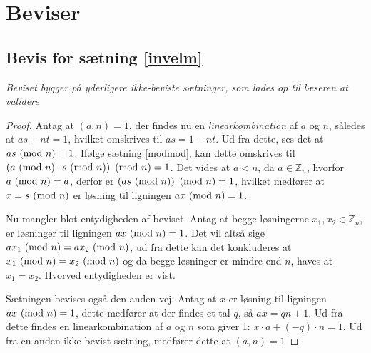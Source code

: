 \section{Beviser} \label{proofs}
\subsection{Bevis for sætning \ref{invelm}}\label{invelemproof}
\textit{Beviset bygger på yderligere ikke-beviste sætninger, som lades op til læseren at validere}
\begin{proof}
    Antag at \((a, n) = 1\), der findes nu en \textit{linearkombination} af \(a\) og \(n\), således at \(a s + n t = 1\),
    hvilket omskrives til \(a s = 1 - n t\).
    Ud fra dette, ses det at \(a s \ (\mathrm{mod}\ n) = 1\).
    Ifølge sætning \ref{modmod}, kan dette omskrives til \(\left(a \ (\mathrm{mod}\ n) \cdot s \ (\mathrm{mod}\ n)\right) \ (\mathrm{mod}\ n) = 1\).
    Det vides at \(a < n\), da \(a \in \mathbb{Z}_n\), hvorfor \(a \ (\mathrm{mod}\ n) = a\),
    derfor er \(\left(a s \ (\mathrm{mod}\ n)\right) \ (\mathrm{mod}\ n) = 1\),
    hvilket medfører at \(x = s \ (\mathrm{mod}\ n)\) er løsning til ligningen \(a x \ (\mathrm{mod}\ n) = 1\).

    Nu mangler blot entydigheden af beviset.
    Antag at begge løsningerne \(x_1, x_2 \in \mathbb{Z}_n\), er løsninger til ligningen \(a x \ (\mathrm{mod}\ n) = 1\).
    Det vil altså sige \(a x_1 \ (\mathrm{mod}\ n) = a x_2 \ (\mathrm{mod}\ n)\),
    ud fra dette kan det konkluderes at \(x_1 \ (\mathrm{mod}\ n) = x_2 \ (\mathrm{mod}\ n)\)
    og da begge løsninger er mindre end \(n\), haves at \(x_1 = x_2\).
    Hvorved entydigheden er vist.

    Sætningen bevises også den anden vej:
    Antag at \(x\) er løsning til ligningen \(a x \ (\mathrm{mod}\ n) = 1\),
    dette medfører at der findes et tal \(q\), så \(a x = q n + 1\).
    Ud fra dette findes en linearkombination af \(a\) og \(n\) som giver 1:
    \(x \cdot a + (-q) \cdot n = 1\).
    Ud fra en anden ikke-bevist sætning, medfører dette at \((a, n) = 1\)\cite[93]{krypto}

\end{proof}


